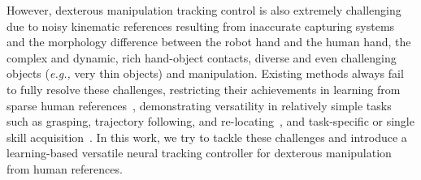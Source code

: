 However, dexterous manipulation tracking control is also extremely challenging due to noisy kinematic references resulting from inaccurate capturing systems and the morphology difference between the robot hand and the human hand, the complex and dynamic, rich hand-object contacts, diverse and even challenging objects (\textit{e.g.,} very thin objects) and manipulation. Existing methods always fail to fully resolve these challenges, restricting their achievements in learning from sparse human references~\citep{christen2022d,zhang2023artigrasp,wu2023learning}, demonstrating versatility in relatively simple tasks such as grasping, trajectory following, and re-locating~\citep{xu2023unidexgrasp,Luo2024GraspingDO,Singh2024HandObjectIP,Chen2024ViViDexLV}, and task-specific or single skill acquisition~\citep{qin2022dexmv,liu2024quasisim,rajeswaran2017learning}. 
In this work, we try to tackle these challenges and introduce a learning-based versatile neural tracking controller for dexterous manipulation from human references. 


